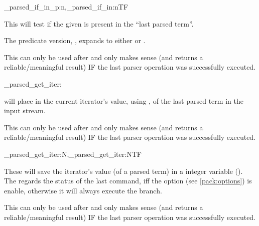 \documentclass[10pt]{article}
\begin{document}
\begin{codedescribe}[code,EXP,new=2023/05/20]{\starray_parsed_if_in_p:n,\starray_parsed_if_in:nTF}
\begin{codesyntax}%
\end{codesyntax}
This will test if the given  is present in the ``last parsed term''. 
\end{codedescribe}
\begin{tsremark}
The predicate version, , expands to either  or \break {}.
\end{tsremark}
\begin{tsremark}
This can only be used after  and only makes sense (and returns a reliable/meaningful result) IF the last parser operation was successfully executed.
\end{tsremark}


\begin{codedescribe}[code,EXP,new=2023/05/20]{\starray_parsed_get_iter:}
\begin{codesyntax}%
\end{codesyntax}
 will place in the current iterator's value,  using , of the last parsed term in the input stream.
\end{codedescribe}
\begin{tsremark}
This can only be used after  and only makes sense (and returns a reliable/meaningful result) IF the last parser operation was successfully executed.
\end{tsremark}

\begin{codedescribe}[code,new=2025/10/25]{\starray_parsed_get_iter:N,\starray_parsed_get_iter:NTF}
\begin{codesyntax}%
\end{codesyntax}
These will save the iterator’s value (of a parsed term) in a integer variable (\cite{expl3}). The  regards the status of the last  command, iff the option  (see \ref{pack:options}) is enable, otherwise it will always execute the  branch.
\end{codedescribe}
\begin{tsremark}
This can only be used after  and only makes sense (and returns a reliable/meaningful result) IF the last parser operation was successfully executed.
\end{tsremark}
\end{document}
